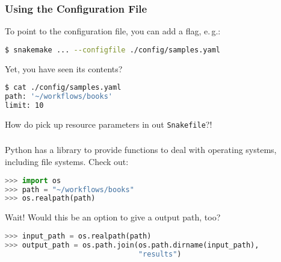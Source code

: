 \begin{frame}[fragile]
  \frametitle{Using the Configuration File}
  To point to the configuration file, you can add a flag, e.\,g.:
  \begin{lstlisting}[language=Bash, style=Shell]
$ snakemake ... --configfile ./config/samples.yaml  
  \end{lstlisting}
  Yet, you have seen its contents?
  \begin{lstlisting}[language=Bash, style=Shell]
$ cat ./config/samples.yaml
path: '~/workflows/books'
limit: 10
  \end{lstlisting}
  \begin{question}
  	How do pick up resource parameters in out \texttt{Snakefile}?!
  \end{question}
\end{frame} 

\begin{frame}[fragile]
  \frametitle{}
  Python has a library to provide functions to deal with operating systems, including file systems. Check out:
  \begin{lstlisting}[language=Python,style=Python]
>>> import os
>>> path = "~/workflows/books"
>>> os.realpath(path)
  \end{lstlisting}
  \pause
  Wait! Would this be an option to give a output path, too?
  \begin{lstlisting}[language=Python,style=Python,basicstyle=\footnotesize]
>>> input_path = os.realpath(path)
>>> output_path = os.path.join(os.path.dirname(input_path),
                               "results")
  \end{lstlisting}
  \vfill
\end{frame}


